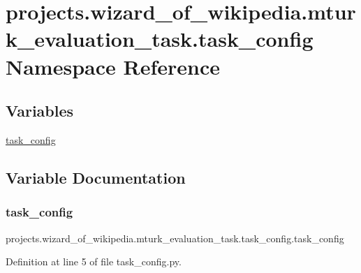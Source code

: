 \hypertarget{namespaceprojects_1_1wizard__of__wikipedia_1_1mturk__evaluation__task_1_1task__config}{}\section{projects.\+wizard\+\_\+of\+\_\+wikipedia.\+mturk\+\_\+evaluation\+\_\+task.\+task\+\_\+config Namespace Reference}
\label{namespaceprojects_1_1wizard__of__wikipedia_1_1mturk__evaluation__task_1_1task__config}
\subsection*{Variables}
\begin{DoxyCompactItemize}
\item 
\hyperlink{namespaceprojects_1_1wizard__of__wikipedia_1_1mturk__evaluation__task_1_1task__config_a19dc45e19001a0818248c55cce31a450}{task\+\_\+config}
\end{DoxyCompactItemize}


\subsection{Variable Documentation}
\mbox{\label{namespaceprojects_1_1wizard__of__wikipedia_1_1mturk__evaluation__task_1_1task__config_a19dc45e19001a0818248c55cce31a450}} 
\subsubsection{\texorpdfstring{task\+\_\+config}{task\_config}}
{\footnotesize\ttfamily projects.\+wizard\+\_\+of\+\_\+wikipedia.\+mturk\+\_\+evaluation\+\_\+task.\+task\+\_\+config.\+task\+\_\+config}



Definition at line 5 of file task\+\_\+config.\+py.

